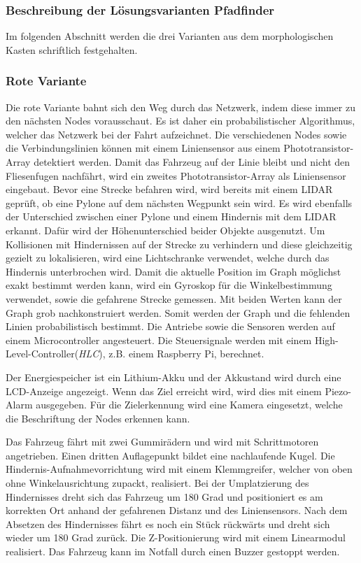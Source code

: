 \documentclass[main.tex]{subfiles} %
\begin{document}

\subsubsection{Beschreibung der Lösungsvarianten Pfadfinder}
Im folgenden Abschnitt werden die drei Varianten aus dem morphologischen Kasten
schriftlich festgehalten.

\subsubsection*{Rote Variante}
Die rote Variante bahnt sich den Weg durch das Netzwerk, indem diese immer zu
den nächsten Nodes vorausschaut. Es ist daher ein probabilistischer
Algorithmus, welcher das Netzwerk bei der Fahrt aufzeichnet. Die verschiedenen
Nodes sowie die Verbindungslinien können mit einem Liniensensor aus einem
Phototransistor-Array detektiert werden. Damit das Fahrzeug auf der Linie
bleibt und nicht den Fliesenfugen nachfährt, wird ein zweites
Phototransistor-Array als Liniensensor eingebaut. Bevor eine Strecke befahren
wird, wird bereits mit einem LIDAR geprüft, ob eine Pylone auf dem nächsten
Wegpunkt sein wird. Es wird ebenfalls der Unterschied zwischen einer Pylone und
einem Hindernis mit dem LIDAR erkannt. Dafür wird der Höhenunterschied beider
Objekte ausgenutzt. Um Kollisionen mit Hindernissen auf der Strecke zu
verhindern und diese gleichzeitig gezielt zu lokalisieren, wird eine
Lichtschranke verwendet, welche durch das Hindernis unterbrochen wird. Damit
die aktuelle Position im Graph möglichst exakt bestimmt werden kann, wird ein
Gyroskop für die Winkelbestimmung verwendet, sowie die gefahrene Strecke
gemessen. Mit beiden Werten kann der Graph grob nachkonstruiert werden. Somit
werden der Graph und die fehlenden Linien probabilistisch bestimmt. Die
Antriebe sowie die Sensoren werden auf einem Microcontroller angesteuert. Die
Steuersignale werden mit einem High-Level-Controller(\textit{HLC}), z.B. einem
Raspberry Pi, berechnet.

Der Energiespeicher ist ein Lithium-Akku und der Akkustand wird durch eine
LCD-Anzeige angezeigt. Wenn das Ziel erreicht wird, wird dies mit einem
Piezo-Alarm ausgegeben. Für die Zielerkennung wird eine Kamera eingesetzt,
welche die Beschriftung der Nodes erkennen kann.

Das Fahrzeug fährt mit zwei Gummirädern und wird mit
Schrittmotoren angetrieben. Einen dritten Auflagepunkt bildet eine nachlaufende Kugel. Die Hindernis-Aufnahmevorrichtung
wird mit einem Klemmgreifer, welcher von oben ohne Winkelausrichtung zupackt,
realisiert. Bei der Umplatzierung des Hindernisses dreht sich das Fahrzeug um
180 Grad und positioniert es am korrekten Ort anhand der gefahrenen Distanz und
des Liniensensors. Nach dem Absetzen des Hindernisses fährt es noch ein Stück
rückwärts und dreht sich wieder um 180 Grad zurück. Die Z-Positionierung wird
mit einem Linearmodul realisiert. Das Fahrzeug kann im Notfall durch einen Buzzer
gestoppt werden.
\end{document}
